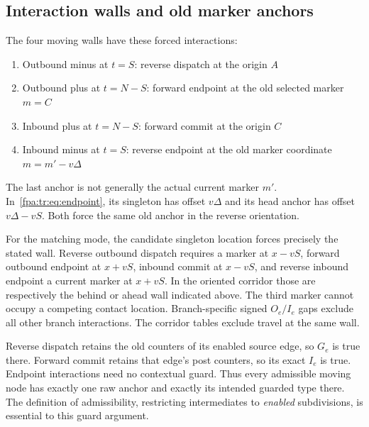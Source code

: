 \documentclass[11pt,a4paper]{article}
\numberwithin{equation}{section}
\begin{document}
\subsection{Interaction walls and old marker anchors}
The four moving walls have these forced interactions:
\begin{enumerate}
\item Outbound minus at $t=S$: reverse dispatch at the origin $A$
\item Outbound plus at $t=N-S$: forward endpoint at the old selected marker $m=C$
\item Inbound plus at $t=N-S$: forward commit at the origin $C$
\item Inbound minus at $t=S$: reverse endpoint at the old marker coordinate $m=m'-v\Delta$
\end{enumerate}
The last anchor is not generally the actual current marker $m'$. In~\eqref{fpa:tr:eq:endpoint}, its singleton has offset $v\Delta$ and its head anchor has offset $v\Delta-vS$. Both force the same old anchor in the reverse orientation.

For the matching mode, the candidate singleton location forces precisely the stated wall. Reverse outbound dispatch requires a marker at $x-vS$, forward outbound endpoint at $x+vS$, inbound commit at $x-vS$, and reverse inbound endpoint a current marker at $x+vS$. In the oriented corridor those are respectively the behind or ahead wall indicated above. The third marker cannot occupy a competing contact location. Branch-specific signed $O_e/I_e$ gaps exclude all other branch interactions. The corridor tables exclude travel at the same wall.

Reverse dispatch retains the old counters of its enabled source edge, so $G_e$ is true there. Forward commit retains that edge's post counters, so its exact $I_e$ is true. Endpoint interactions need no contextual guard. Thus every admissible moving node has exactly one raw anchor and exactly its intended guarded type there. The definition of admissibility, restricting intermediates to \emph{enabled} subdivisions, is essential to this guard argument.
\end{document}
